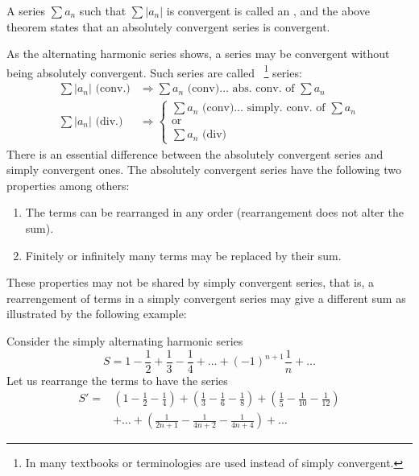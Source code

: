 \documentclass[11pt]{amsbook}
\begin{document}
A series $\sum a_{n}$ such that $\sum|a_{n}|$ is convergent is called an
, and
the above theorem states 
that an absolutely convergent series is convergent.

As the alternating harmonic series shows, a series may be
convergent without being absolutely convergent. Such series are
called ~\footnote{
	In many textbooks 
	 or 
	terminologies are used instead of simply convergent.
} 
series:
\begin{align*}
    \sum|a_{n}| \text{ (conv.)} 
        &\Longrightarrow 
        \sum a_{n} \text{ (conv)} \dots \text{ abs. conv. of  } \sum a_{n}\\
    \sum|a_{n}| \text{ (div.)} 
        &\Longrightarrow 
        \left\{
            \begin{array}{ll}
             \sum a_{n} \text{ (conv)} \dots \text{ simply. conv. of  } \sum a_{n}\\
             \text{or}\\
             \sum a_{n} \text{ (div)} 
    \end{array}
    \right.    
\end{align*}
There is an essential difference between the absolutely convergent series and simply convergent ones. 
The absolutely convergent series have the following two properties among others:

\begin{enumerate}

    \item 
    The terms can be rearranged in any order 
    (rearrangement does not alter the sum).
    
    \item 
    Finitely or infinitely many terms may be replaced by their sum.
\end{enumerate}

These properties may not be shared by simply convergent series, 
that is, a rearrengement of terms in a simply convergent
series may give a different sum as illustrated by the following example:

Consider the simply alternating harmonic series
\[
    S
    = 
    1 - \frac{1}{2} + \frac{1}{3} - \frac{1}{4} + \dots + (-1)^{n+1} \frac{1}{n} + \dots
\]
Let us rearrange the terms to have the series 
\begin{align*}
	S'
	=
	&\left( 1 - \frac{1}{2} - \frac{1}{4} \right)
	+ \left( \frac{1}{3} - \frac{1}{6} - \frac{1}{8} \right) 
	+ \left( \frac{1}{5} - \frac{1}{10} - \frac{1}{12} \right)\\
	&+ \dots
	+ \left(\frac{1}{2n+1} - \frac{1}{4n+2} -\frac{1}{4n+4} \right) 
	+ \dots 
\end{align*}



\end{document}
